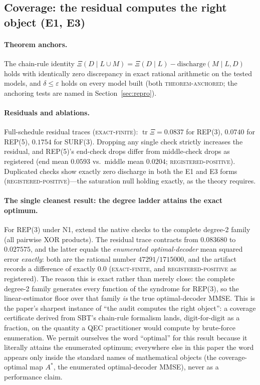 \documentclass[11pt]{article}
\newcommand{\grade}[1]{\textsc{#1}}
\newcommand{\gTheorem}{\grade{theorem-anchored}}
\newcommand{\gExact}{\grade{exact-finite}}
\newcommand{\gRegPos}{\grade{registered-positive}}
\newcommand{\Xires}{\Xi(D \mid L)}
\theoremstyle{definition}
\begin{document}
\subsection{Coverage: the residual computes the right object (E1, E3)}
\label{sec:results-coverage}

\paragraph{Theorem anchors.} The chain-rule identity $\Xi(D \mid L \cup M) = \Xires - \mathrm{discharge}(M \mid L, D)$ holds with identically zero discrepancy in exact rational arithmetic on the tested models, and $\delta \le \varepsilon$ holds on every model built (both \gTheorem; the anchoring tests are named in Section~\ref{sec:repro}). 

\paragraph{Residuals and ablations.} Full-schedule residual traces (\gExact): $\operatorname{tr}\Xi = 0.0837$ for REP(3), $0.0740$ for REP(5), $0.1754$ for SURF(3). Dropping any single check strictly increases the residual, and REP(5)'s end-check drops differ from middle-check drops as registered (end mean $0.0593$ vs.\ middle mean $0.0204$; \gRegPos). Duplicated checks show exactly zero discharge in both the E1 and E3 forms (\gRegPos)---the saturation null holding exactly, as the theory requires. 

\paragraph{The single cleanest result: the degree ladder attains the exact optimum.} For REP(3) under N1, extend the native checks to the complete degree-2 family (all pairwise XOR products). The residual trace contracts from $0.083680$ to $0.027575$, and the latter equals the \emph{enumerated optimal-decoder} mean squared error \emph{exactly}: both are the rational number $47291/1715000$, and the artifact records a difference of exactly $0.0$ (\gExact, and \gRegPos{} as registered). The reason this is exact rather than merely close: the complete degree-2 family generates every function of the syndrome for REP(3), so the linear-estimator floor over that family \emph{is} the true optimal-decoder MMSE. This is the paper's sharpest instance of ``the audit computes the right object'': a coverage certificate derived from SBT's chain-rule formalism lands, digit-for-digit as a fraction, on the quantity a QEC practitioner would compute by brute-force enumeration. We permit ourselves the word ``optimal'' for this result because it literally attains the enumerated optimum; everywhere else in this paper the word appears only inside the standard names of mathematical objects (the coverage-optimal map $A^{*}$, the enumerated optimal-decoder MMSE), never as a performance claim.
\end{document}
